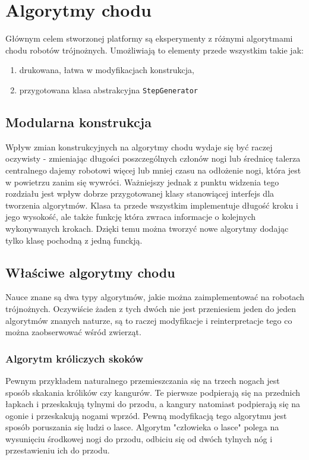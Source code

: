 \chapter{Algorytmy chodu}
Głównym celem stworzonej platformy są eksperymenty z różnymi algorytmami chodu robotów trójnożnych. Umożliwiają to elementy przede wszystkim takie jak:
\begin{enumerate}[noitemsep]
    \item drukowana, łatwa w modyfikacjach konstrukcja,
    \item przygotowana klasa abstrakcyjna \texttt{StepGenerator}
\end{enumerate}

\section{Modularna konstrukcja}

Wpływ zmian konstrukcyjnych na algorytmy chodu wydaje się być raczej oczywisty - zmieniając długości poszczególnych członów nogi lub średnicę talerza centralnego dajemy robotowi więcej lub mniej czasu na odłożenie nogi, która jest w powietrzu zanim się wywróci. Ważniejszy jednak z punktu widzenia tego rozdziału jest wpływ dobrze przygotowanej klasy stanowiącej interfejs dla tworzenia algorytmów. Klasa ta przede wszystkim implementuje długość kroku i jego wysokość, ale także funkcję która zwraca informacje o kolejnych wykonywanych krokach. Dzięki temu można tworzyć nowe algorytmy dodając tylko klasę pochodną z jedną funckją.

\section{Właściwe algorytmy chodu \cite{triped_walking}} 
Nauce znane są dwa typy algorytmów, jakie można zaimplementować na robotach trójnożnych. Oczywiście żaden z tych dwóch nie jest przeniesiem jeden do jeden algorytmów znanych naturze, są to raczej modyfikacje i reinterpretacje tego co można zaobserwować wśród zwierząt.

\subsection{Algorytm króliczych skoków}
Pewnym przykładem naturalnego przemieszczania się na trzech nogach jest sposób skakania królików czy kangurów. Te pierwsze podpierają się na przednich łapkach i przeskakują tylnymi do przodu, a kangury natomiast podpierają się na ogonie i przeskakują nogami wprzód. Pewną modyfikacją tego algorytmu jest sposób poruszania się ludzi o lasce. Algorytm "człowieka o lasce" polega na wysunięciu środkowej nogi do przodu, odbiciu się od dwóch tylnych nóg i przestawieniu ich do przodu.\\

